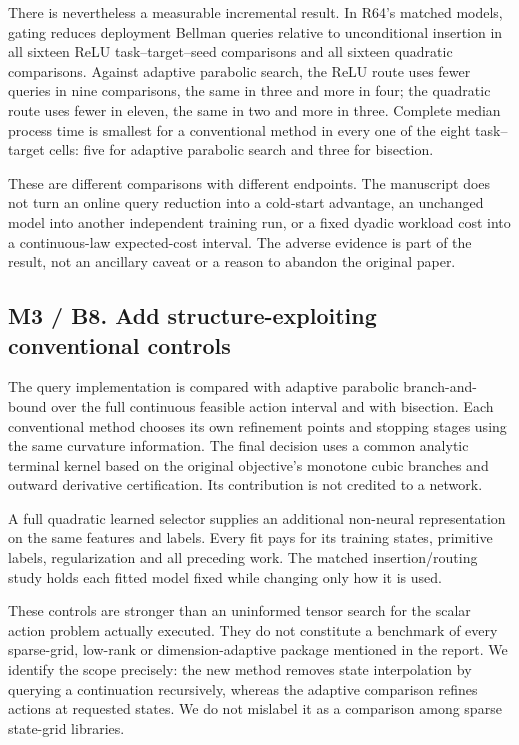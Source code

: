 \documentclass[ecta,nameyear,draft]{econsocart}
\begin{document}
There is nevertheless a measurable incremental result. In R64's matched
models, gating reduces deployment Bellman queries relative to
unconditional insertion in all sixteen ReLU task--target--seed
comparisons and all sixteen quadratic comparisons. Against adaptive
parabolic search, the ReLU route uses fewer queries in nine comparisons,
the same in three and more in four; the quadratic route uses fewer in
eleven, the same in two and more in three. Complete median process time
is smallest for a conventional method in every one of the eight
task--target cells: five for adaptive parabolic search and three for
bisection.

These are different comparisons with different endpoints. The manuscript
does not turn an online query reduction into a cold-start advantage, an
unchanged model into another independent training run, or a fixed dyadic
workload cost into a continuous-law expected-cost interval. The adverse
evidence is part of the result, not an ancillary caveat or a reason to
abandon the original paper.

\hypertarget{m3-b8.-add-structure-exploiting-conventional-controls}{%
\subsection{M3 / B8. Add structure-exploiting conventional
controls}\label{m3-b8.-add-structure-exploiting-conventional-controls}}

The query implementation is compared with adaptive parabolic
branch-and-bound over the full continuous feasible action interval and
with bisection. Each conventional method chooses its own refinement
points and stopping stages using the same curvature information. The
final decision uses a common analytic terminal kernel based on the
original objective's monotone cubic branches and outward derivative
certification. Its contribution is not credited to a network.

A full quadratic learned selector supplies an additional non-neural
representation on the same features and labels. Every fit pays for its
training states, primitive labels, regularization and all preceding
work. The matched insertion/routing study holds each fitted model fixed
while changing only how it is used.

These controls are stronger than an uninformed tensor search for the
scalar action problem actually executed. They do not constitute a
benchmark of every sparse-grid, low-rank or dimension-adaptive package
mentioned in the report. We identify the scope precisely: the new method
removes state interpolation by querying a continuation recursively,
whereas the adaptive comparison refines actions at requested states. We
do not mislabel it as a comparison among sparse state-grid libraries.
\end{document}
